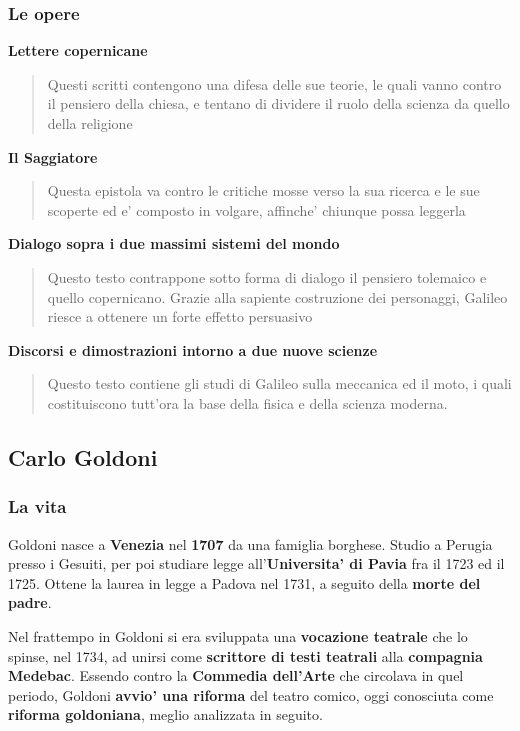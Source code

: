 \documentclass{article}
\begin{document}
{{    \subsubsection{Le opere} %
    \textbf{Lettere copernicane}
    \begin{quote}
      Questi scritti contengono una difesa delle sue teorie, le quali vanno contro il pensiero della chiesa, e tentano di dividere il ruolo della scienza da quello della religione
    \end{quote}

    \textbf{Il Saggiatore}
    \begin{quote}
      Questa epistola va contro le critiche mosse verso la sua ricerca e le sue scoperte ed e' composto in volgare, affinche' chiunque possa leggerla
    \end{quote}

    \textbf{Dialogo sopra i due massimi sistemi del mondo}
    \begin{quote}
      Questo testo contrappone sotto forma di dialogo il pensiero tolemaico e quello copernicano. Grazie alla sapiente costruzione dei personaggi, Galileo riesce a ottenere un forte effetto persuasivo
    \end{quote}

    \textbf{Discorsi e dimostrazioni intorno a due nuove scienze}
    \begin{quote}
      Questo testo contiene gli studi di Galileo sulla meccanica ed il moto, i quali costituiscono tutt'ora la base della fisica e della scienza moderna.
    \end{quote}

    \subsection{Carlo Goldoni}
    \subsubsection{La vita} %
    Goldoni nasce a \textbf{Venezia} nel \textbf{1707} da una famiglia borghese. Studio a Perugia presso i Gesuiti, per poi studiare legge all'\textbf{Universita' di Pavia} fra il 1723 ed il 1725. Ottene la laurea in legge a Padova nel 1731, a seguito della \textbf{morte del padre}.

    Nel frattempo in Goldoni si era sviluppata una \textbf{vocazione teatrale} che lo spinse, nel 1734, ad unirsi come \textbf{scrittore di testi teatrali} alla \textbf{compagnia Medebac}. Essendo contro la \textbf{Commedia dell'Arte} che circolava in quel periodo, Goldoni \textbf{avvio' una riforma} del teatro comico, oggi conosciuta come \textbf{riforma goldoniana}, meglio analizzata in seguito.

}}
\end{document}
